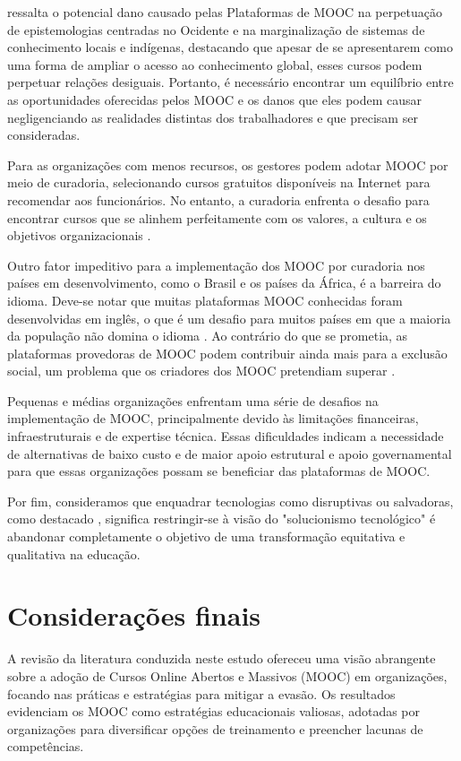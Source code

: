 \documentclass[portuguese]{textolivre}
\begin{document}
\textcite{adam_digital_2019} ressalta o potencial dano causado pelas Plataformas de MOOC na perpetuação de epistemologias centradas no Ocidente e na marginalização de sistemas de conhecimento locais e indígenas, destacando que apesar de se apresentarem como uma forma de ampliar o acesso ao conhecimento global, esses cursos podem perpetuar relações desiguais. Portanto, é necessário encontrar um equilíbrio entre as oportunidades oferecidas pelos MOOC e os danos que eles podem causar negligenciando as realidades distintas dos trabalhadores e que precisam ser consideradas.

Para as organizações com menos recursos, os gestores podem adotar MOOC por meio de curadoria, selecionando cursos gratuitos disponíveis na Internet para recomendar aos funcionários. No entanto, a curadoria enfrenta o desafio para encontrar cursos que se alinhem perfeitamente com os valores, a cultura e os objetivos organizacionais \cite{zur_transforming_2021,yan_construction_2022}. 

Outro fator impeditivo para a implementação dos MOOC por curadoria nos países em desenvolvimento, como o Brasil e os países da África, é a barreira do idioma. Deve-se notar que muitas plataformas MOOC conhecidas foram desenvolvidas em inglês, o que é um desafio para muitos países em que a maioria da população não domina o idioma \cite{adam_digital_2019}. Ao contrário do que se prometia, as plataformas provedoras de MOOC podem contribuir ainda mais para a exclusão social, um problema que os criadores dos MOOC pretendiam superar \cite{goglio_contribution_2021}.

Pequenas e médias organizações enfrentam uma série de desafios na implementação de MOOC, principalmente devido às limitações financeiras, infraestruturais e de expertise técnica. Essas dificuldades indicam a necessidade de alternativas de baixo custo e de maior apoio estrutural e apoio governamental para que essas organizações possam se beneficiar das plataformas de MOOC. 

Por fim, consideramos que enquadrar tecnologias como disruptivas ou salvadoras, como destacado \textcite{knox_beyond_2018}, significa restringir-se à visão do "solucionismo tecnológico" é abandonar completamente o objetivo de uma transformação equitativa e qualitativa na educação.

\section{Considerações finais}\label{sec-modelo}
A revisão da literatura conduzida neste estudo ofereceu uma visão abrangente sobre a adoção de Cursos Online Abertos e Massivos (MOOC) em organizações, focando nas práticas e estratégias para mitigar a evasão. Os resultados evidenciam os MOOC como estratégias educacionais valiosas, adotadas por organizações para diversificar opções de treinamento e preencher lacunas de competências.
\end{document}
